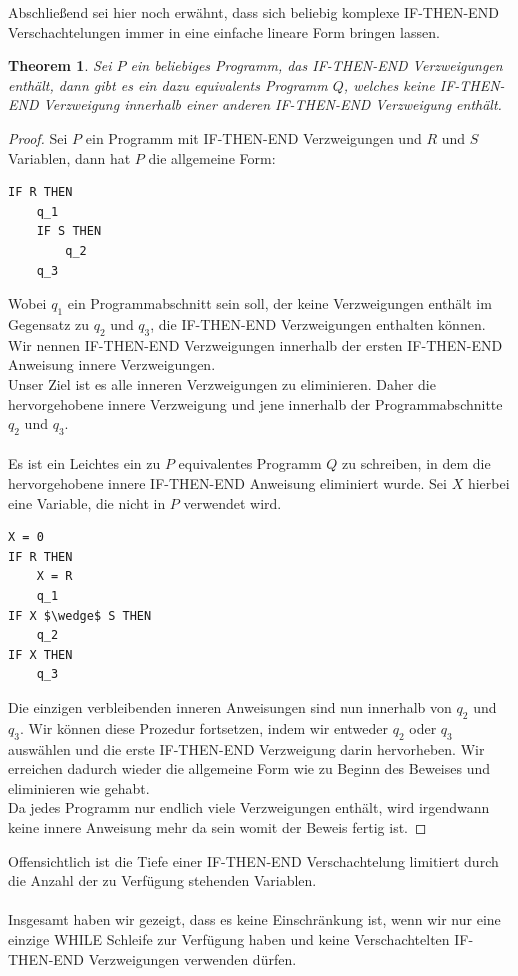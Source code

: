 \documentclass[11pt,a4paper,leqno]{report}
\newtheorem{theorem}{Theorem}[chapter]
\numberwithin{equation}{chapter}
\begin{document}
\noindent
Abschlie\ss{}end sei hier noch erw\"ahnt, dass sich beliebig komplexe IF-THEN-END Verschachtelungen immer in eine einfache lineare Form bringen lassen.
\begin{theorem} 
	Sei $P$ ein beliebiges Programm, das IF-THEN-END Verzweigungen enth\"alt, dann gibt es ein dazu equivalents Programm $Q$, welches keine IF-THEN-END Verzweigung innerhalb einer anderen IF-THEN-END Verzweigung enth\"alt.
\end{theorem}
\begin{proof}
Sei $P$ ein Programm mit IF-THEN-END Verzweigungen und $R$ und $S$ Variablen, dann hat $P$ die allgemeine Form:
\begin{lstlisting}
IF R THEN
	q_1
	IF S THEN
		q_2
	q_3
\end{lstlisting}
Wobei $q_1$ ein Programmabschnitt sein soll, der keine Verzweigungen enth\"alt im Gegensatz zu $q_2$ und $q_3$, die IF-THEN-END Verzweigungen enthalten k\"onnen. \\
Wir nennen IF-THEN-END Verzweigungen innerhalb der ersten IF-THEN-END Anweisung innere Verzweigungen.\\
Unser Ziel ist es alle inneren Verzweigungen zu eliminieren. Daher die hervorgehobene innere Verzweigung und jene innerhalb der Programmabschnitte $q_2$ und $q_3$.\\
\\
Es ist ein Leichtes ein zu $P$ equivalentes Programm $Q$ zu schreiben, in dem die hervorgehobene innere IF-THEN-END Anweisung eliminiert wurde. Sei $X$ hierbei eine Variable, die nicht in $P$ verwendet wird.
\begin{lstlisting}[mathescape=true]
X = 0
IF R THEN
	X = R
	q_1
IF X $\wedge$ S THEN
	q_2
IF X THEN
	q_3
\end{lstlisting}
Die einzigen verbleibenden inneren Anweisungen sind nun innerhalb von $q_2$ und $q_3$. Wir k\"onnen diese Prozedur fortsetzen, indem wir entweder $q_2$ oder $q_3$ ausw\"ahlen und die erste IF-THEN-END Verzweigung darin hervorheben. Wir erreichen dadurch wieder die allgemeine Form wie zu Beginn des Beweises und eliminieren wie gehabt.\\
Da jedes Programm nur endlich viele Verzweigungen enth\"alt, wird irgendwann keine innere Anweisung mehr da sein womit der Beweis fertig ist.
\end{proof}
\noindent
Offensichtlich ist die Tiefe einer IF-THEN-END Verschachtelung limitiert durch die Anzahl der zu Verf\"ugung stehenden Variablen.\\
\\
Insgesamt haben wir gezeigt, dass es keine Einschr\"ankung ist, wenn wir nur eine einzige WHILE Schleife zur Verf\"ugung haben und keine Verschachtelten IF-THEN-END Verzweigungen verwenden d\"urfen.
\end{document}
